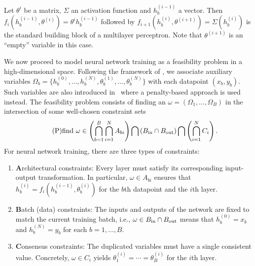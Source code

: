 \documentclass{article}
\begin{document}
\begin{example}
    Let $\theta^i$ be a matrix, $\Sigma$ an activation function and $h_b^{(i-1)}$ a vector. Then $f_i(h^{(i-1)}_b, \theta^{(i)}) = \theta^i h^{(i-1)}_b$ followed by $f_{i+1}(h^{(i)}_b, \theta^{(i+1)}) = \Sigma(h^{(i)}_b)$ is the standard building block of a multilayer perceptron. Note that $\theta^{(i+1)}$ is an ``empty'' variable in this case.
\end{example}
We now proceed to model neural network training as a feasibility problem in a high-dimensional space. Following the framework of \cite{elser2019learning, bergmeister2025projection}, we associate auxiliary variables $\Omega_b =\{h^{(0)}_b, \ldots, h^{(N)}_b, \theta^{(1)}_b, \ldots, \theta_b^{(N)}\}$ with each datapoint $(x_b, y_b)$. Such variables are also introduced in~\cite{carreira2014distributed} where a penalty-based approach is used instead. The feasibility problem consists of finding an $\omega = (\Omega_1, \ldots, \Omega_B)$ in the intersection of some well-chosen constraint sets
\begin{equation} \label{eq:feasibility} \tag{P}
    \textnormal{find } \omega \in \left(\bigcap_{b=1}^B\bigcap_{i=1}^N A_{bi}\right) \bigcap \left(B_{\rm in} \cap B_{\rm out}\right) \bigcap \left(\bigcap_{i=1}^N C_i\right).
\end{equation}
For neural network training, there are three types of constraints:
\begin{enumerate}[leftmargin=2em]
    \item \textbf{A}rchitectural constraints: Every layer must satisfy its corresponding input-output transformation. In particular, $\omega \in A_{bi}$ ensures that $h_b^{(i)} = f_i(h_b^{(i-1)}, \theta_b^{(i)})$ for the $b$th datapoint and the $i$th layer.
    \item \textbf{B}atch (data) constraints: The inputs and outputs of the network are fixed to match the current training batch, i.e., $\omega \in B_{\rm in} \cap B_{\rm out}$ means that $h_b^{(0)} = x_b$ and $h_b^{(N)} = y_b$ for each $b=1,\ldots,B$.
    \item \textbf{C}onsensus constraints: The duplicated variables must have a single consistent value. Concretely, $\omega \in C_i$ yields $\theta_1^{(i)} = \cdots = \theta_B^{(i)}$ for the $i$th layer. 
\end{enumerate}
\end{document}
